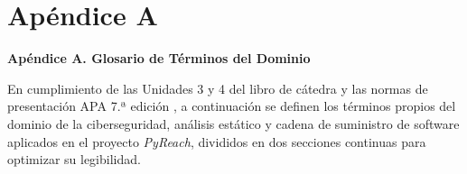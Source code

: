 \documentclass[12pt,a4paper]{article}
\begin{document}
\section*{Apéndice A}

\begin{center}
    {\normalfont\Large\bfseries Apéndice A. Glosario de Términos del Dominio \par}
\end{center}
\vspace{0.3cm}

\noindent
En cumplimiento de las Unidades 3 y 4 del libro de cátedra y las normas de presentación APA 7.ª edición \parencite{apa2020publication, torres2026proyecto}, a continuación se definen los términos propios del dominio de la ciberseguridad, análisis estático y cadena de suministro de software aplicados en el proyecto \textit{PyReach}, divididos en dos secciones continuas para optimizar su legibilidad.
\end{document}
